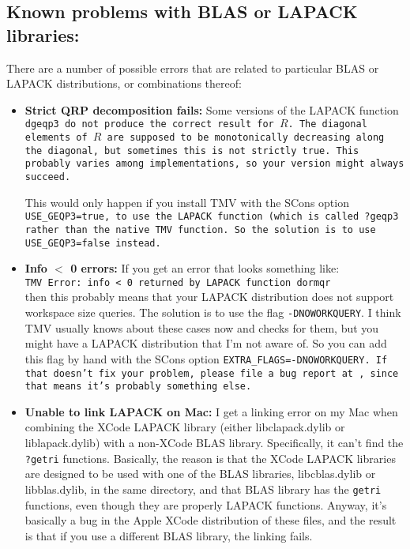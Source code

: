 \subsection{Known problems with BLAS or LAPACK libraries:}
There are a number of possible errors that are related to particular BLAS or LAPACK
distributions, or combinations thereof:
\begin{itemize}

\item{\bf Strict QRP decomposition fails:}
Some versions of the LAPACK function \tt{dgeqp3} do not produce the correct
result for $R$.  The diagonal elements of $R$ are supposed to be monotonically decreasing
along the diagonal, but sometimes this is not strictly true.  This probably varies among
implementations, so your version might always succeed.

This would only happen if you install TMV with the SCons option \tt{USE_GEQP3=true},
to use the LAPACK function (which is called \tt{?geqp3} rather than the native TMV function.  So the solution is to use \tt{USE_GEQP3=false} instead.

\item{\bf Info $<$ 0 errors:}
If you get an error that looks something like:\\
\texttt{TMV Error: info < 0 returned by LAPACK function dormqr}\\
then this probably means that your LAPACK distribution does not support
workspace size queries.  The solution is to use the flag \texttt{-DNOWORKQUERY}.
I think TMV usually knows about these cases now and checks for them, but you might have a LAPACK distribution that I'm not aware of.  So you can add this flag by hand with the SCons option \tt{EXTRA_FLAGS=-DNOWORKQUERY}.  If that doesn't fix your problem, please file a bug report at  \myissues, since that means it's probably something else.

\item {\bf Unable to link LAPACK on Mac:}
I get a linking error on my Mac when combining the XCode LAPACK library
(either libclapack.dylib or liblapack.dylib) with a non-XCode BLAS library.
Specifically, it can't find the \texttt{?getri} functions.   Basically, the reason is that
the XCode LAPACK libraries are designed to be used with one of the BLAS
libraries, libcblas.dylib or libblas.dylib, in the same directory, 
and that BLAS library has the \texttt{getri}
functions, even though they are properly LAPACK functions.
Anyway, it's basically a bug in the Apple XCode distribution of these files,
and the result is that if you use a different BLAS library, the linking fails.


\end{itemize}
